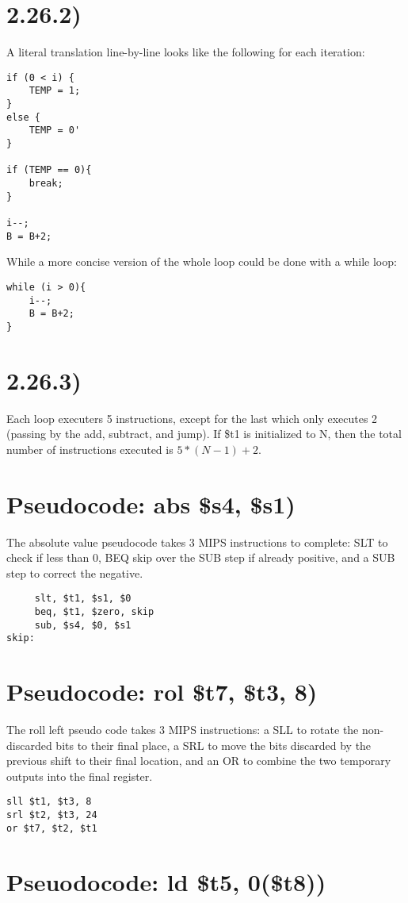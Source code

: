 \documentclass[a4paper,11pt]{article}
\begin{document}
\section*{2.26.2)}
A literal translation line-by-line looks like the following for each iteration:
\begin{verbatim}
if (0 < i) {
    TEMP = 1;
}
else {
    TEMP = 0'
}

if (TEMP == 0){
    break;
}

i--;
B = B+2;
\end{verbatim}

\noindent While a more concise version of the whole loop could be done with a while loop:
\begin{verbatim}
while (i > 0){
    i--;
    B = B+2;
}
\end{verbatim}

\section*{2.26.3)}
Each loop executers 5 instructions, except for the last which only executes 2 (passing by the add, subtract, and jump).  If \$t1 is initialized to N, then the total number of instructions executed is $5*(N-1) + 2$.

\section*{Pseudocode: abs  \$s4, \$s1)}
The absolute value pseudocode takes 3 MIPS instructions to complete:  SLT to check if less than 0, BEQ skip over 
the SUB step if already positive, and a SUB step to correct the negative.
\begin{verbatim}
     slt, $t1, $s1, $0
     beq, $t1, $zero, skip
     sub, $s4, $0, $s1
skip:
\end{verbatim}

\section*{Pseudocode: rol  \$t7, \$t3, 8)}
The roll left pseudo code takes 3 MIPS instructions: a SLL to rotate the non-discarded bits to their final place, a SRL to
move the bits discarded by the previous shift to their final location, and an OR to combine the two temporary outputs
into the final register.
\begin{verbatim}
sll $t1, $t3, 8   
srl $t2, $t3, 24
or $t7, $t2, $t1

\end{verbatim}

\section*{Pseuodocode: ld  \$t5, 0(\$t8))}

\begin{verbatim}


\end{verbatim}

\end{document}

